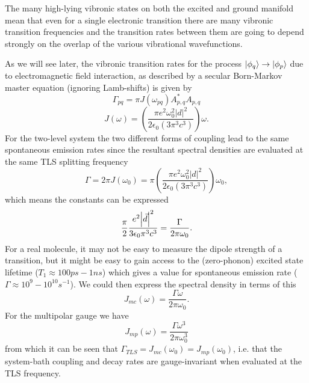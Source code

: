 \documentclass[]{article}
\begin{document}
The many high-lying vibronic states on both the excited and ground manifold mean that even for a single electronic transition there are many vibronic transition frequencies and the transition rates between them are going to depend strongly on the overlap of the various vibrational wavefunctions. 

As we will see later, the vibronic transition rates for the process $\ket{\phi_q}\to\ket{\phi_p}$ due to electromagnetic field interaction, as described by a secular Born-Markov master equation (ignoring Lamb-shifts) is given by
\begin{equation}
\Gamma_{pq} = \pi J(\omega_{pq}) A_{p,q}^{*}A_{p,q}
\end{equation}
\begin{equation}
J(\omega) = \left(\frac{\pi e^2\omega_0^2 |d|^2}{2\epsilon_0(3\pi^3 c^3)}\right)\omega.
\end{equation}
For the two-level system the two different forms of coupling lead to the same spontaneous emission rates since the resultant spectral densities are evaluated at the same TLS splitting frequency
\begin{equation}
\label{eq:TLS_decay}
\Gamma = 2\pi J(\omega_0) = \pi\left(\frac{\pi e^2\omega_0^2 |d|^2}{2\epsilon_0(3\pi^3 c^3)}\right)\omega_0,
\end{equation}
which means the constants can be expressed
\begin{equation}
\frac{\pi}{2} \frac{e^2\abs{\vec{d}}^2}{3\epsilon_0\pi^3c^3} = \frac{\Gamma}{2\pi\omega_0}.
\end{equation}
For a real molecule, it may not be easy to measure the dipole strength of a transition, but it might be easy to gain access to the (zero-phonon) excited state lifetime ($T_1 \approx 100ps - 1ns$) which gives a value for spontaneous emission rate ($\Gamma\approx 10^9-10^{10}s^{-1}$). We could then express the spectral density in terms of this
\begin{equation}
\label{eq:MinimalSpectral}
J_{mc}(\omega) = \frac{\Gamma\omega}{2\pi\omega_0}.
\end{equation}
For the multipolar gauge we have
\begin{equation}
\label{eq:MultipolarSpectral}
J_{mp}(\omega) = \frac{\Gamma\omega^3}{2\pi\omega_0^3}
\end{equation}
from which it can be seen that $\Gamma_{TLS}=J_{mc}(\omega_0)=J_{mp}(\omega_0)$, i.e. that the system-bath coupling and decay rates are gauge-invariant when evaluated at the TLS frequency.
\end{document}
